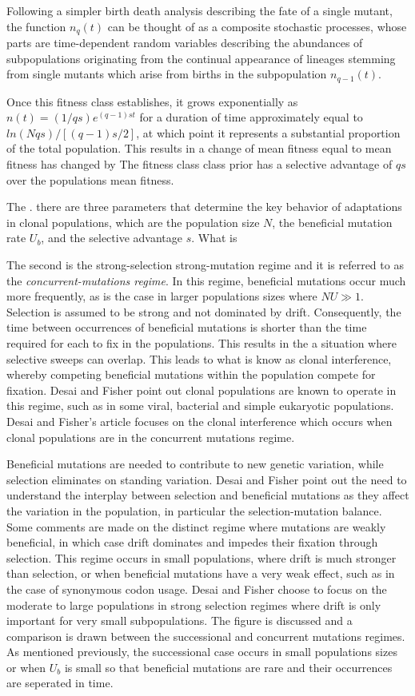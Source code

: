 \documentclass[12pt,twocolumn]{article}
\begin{document}
Following a simpler birth death analysis describing the fate of a single mutant, the function $n_q(t)$ can be thought of as a composite stochastic processes, whose parts are time-dependent random variables describing the abundances of subpopulations originating from the continual appearance of lineages stemming from single mutants which arise from births in the subpopulation $n_{q-1}(t)$.  

Once this fitness class establishes, it grows exponentially as $n(t)=(1/qs)e^{(q-1)st}$ for a duration of time approximately equal to $ln(Nqs)/[(q-1)s/2]$, at which point it represents a substantial proportion of the total population.  This results in a change of mean fitness equal to  mean fitness has changed by  The fitness class class prior has a selective advantage of $qs$ over the populations mean fitness.

The . there are three parameters that determine the key behavior of adaptations in clonal populations, which are the population size $N$, the beneficial mutation rate $U_b$, and the selective advantage $s$.  What is  

The second is the strong-selection strong-mutation regime and it is referred to as the \textit{concurrent-mutations regime}. In this regime, beneficial mutations occur much more frequently, as is the case in larger populations sizes where $NU \gg 1$.  Selection is assumed to be strong and not dominated by drift.  Consequently, the time between occurrences of beneficial mutations is shorter than the time required for each to fix in the populations.  This results in the a situation where selective sweeps can overlap. This leads to what is know as clonal interference, whereby competing beneficial mutations within the population compete for fixation. Desai and Fisher point out clonal populations are known to operate in this regime, such as in some viral, bacterial and simple eukaryotic populations.  Desai and Fisher's article focuses on the clonal interference which occurs when clonal populations are in the concurrent mutations regime.  

Beneficial mutations are needed to contribute to new genetic variation, while selection eliminates on standing variation.  Desai and Fisher point out the need to understand the interplay between selection and beneficial mutations as they affect the variation in the population, in particular the selection-mutation balance.  Some comments are made on the distinct regime where mutations are weakly beneficial, in which case drift dominates and impedes their fixation through selection.  This regime occurs in small populations, where drift is much stronger than selection, or when beneficial mutations have a very weak effect, such as in the case of synonymous codon usage.  Desai and Fisher choose to focus on the moderate to large populations in strong selection regimes where drift is only important for very small subpopulations.  The figure is discussed and a comparison is drawn between the successional and concurrent mutations regimes.  As mentioned previously, the successional case occurs in small populations sizes or when $U_b$ is small so that beneficial mutations are rare and their occurrences are seperated in time.
\end{document}
